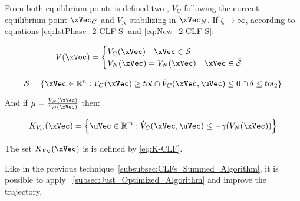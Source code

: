 \subsubsection{}
\label{subsubsec:CLFs_Independent_Algorithm}

From both equilibrium points is defined two , \(V_C\) following the current equilibrium point \(\bar{\xVec_C}\) and \(V_N\) stabilizing in \(\bar{\xVec_N}\). If \(\zeta \to \infty\), according to equations \ref{eq:1stPhase_2-CLF-S} and \ref{eq:New_2-CLF-S}:


\begin{align}
    V(\xVec) = 
    \begin{cases}
        V_C(\xVec) \quad \xVec \in \mathcal{S}\\
        V_N(\xVec) = V_{N}(\xVec) \quad \xVec \in \bar{\mathcal{S}}
    \end{cases}
    \label{eq:New_2-CLF-I}
\end{align}


\begin{equation}
    \mathcal{S} = \{\xVec \in \mathbb{R}^n: V_{C}(\xVec) \geq tol \cap \dot{V}_{C}(\xVec, \uVec) \leq 0 \cap \delta \leq tol_2\}
    \label{eq:New_2-CLF-I_actuationPhaseSet}
\end{equation}



And if \(\mu = \frac{V_{N}(\xVec)}{V_{C}(\xVec)}\) then:

\begin{align}
    K_{V_C}(\xVec) = \Bigl\{\uVec \in \mathbb{R}^m:  \dot{V}_{C}(\xVec, \uVec) \leq -\gamma( V_{N}(\xVec)  )\Bigr\}
    \label{eq:2-CLF-I_Constraint}
\end{align}

The set \(K_{V_N}(\xVec)\) is is defined by \ref{eq:K-CLF}. \par
Like in the previous technique~\ref{subsubsec:CLFs_Summed_Algorithm}, it is possible to apply ~\ref{subsec:Just_Optimized_Algorithm} and improve the trajectory.\\
































